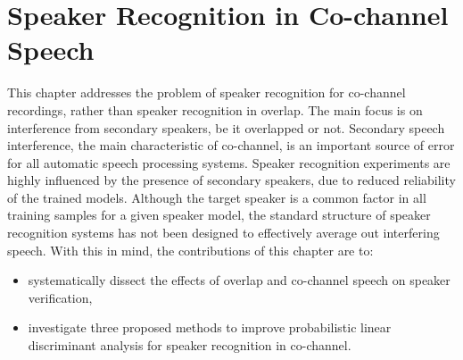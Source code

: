 
\chapter{Speaker Recognition in Co-channel Speech}
\label{chapter:backend}


This chapter addresses the problem of speaker recognition for co-channel recordings, rather than speaker recognition in overlap. 
The main focus is on interference from secondary speakers, be it overlapped or not. 
Secondary speech interference, the main characteristic of co-channel, is an important source of error for all automatic speech processing systems. Speaker recognition experiments are highly influenced by the presence of secondary speakers, due to reduced reliability of the trained models. 
Although the target speaker is a common factor in all training samples for a given speaker model, the standard structure of speaker recognition systems has not been designed to effectively average out interfering speech. With this in mind, the contributions of this chapter are to:
\begin{itemize}
	\item systematically dissect the effects of overlap and co-channel speech on speaker verification, 
	\item investigate three proposed methods to improve probabilistic linear discriminant analysis for speaker recognition in co-channel. 
\end{itemize}

